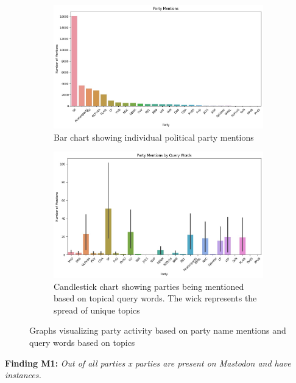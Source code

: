 \begin{figure}[ht]
  \centering
  \begin{subfigure}[h]{.49\linewidth}
    \includegraphics[width=\textwidth]{media/party-mentions.jpeg}
    \captionsetup{justification=centering}
    \caption{Bar chart showing individual political party mentions}
    \label{fig:partymentions}
  \end{subfigure}
  \begin{subfigure}[h]{.49\linewidth}
      \captionsetup{justification=centering}
      \includegraphics[width=\textwidth]{media/party-mentions-query-words.jpeg}
      \caption{Candlestick chart showing parties being mentioned based on topical query words. The wick represents the spread of unique topics}
      \label{fig:partycandle}
  \end{subfigure}
  \caption{Graphs visualizing party activity based on party name mentions and query words based on topics}
  \label{fig:results}
\end{figure}

\textbf{Finding M1:} \textit{Out of all parties x parties are present on Mastodon and have instances.}

